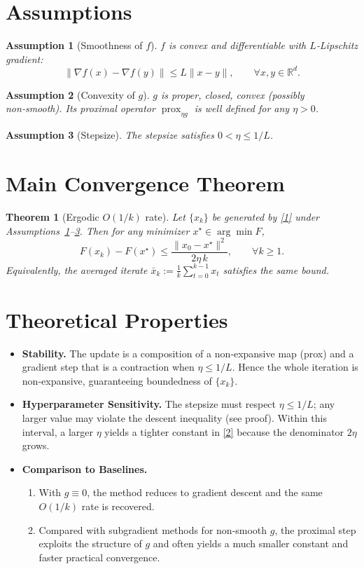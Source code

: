 \documentclass{article}
\newtheorem{theorem}{Theorem}
\newtheorem{assumption}{Assumption}
\newcommand{\prox}{\operatorname{prox}}
\newcommand{\R}{\mathbb{R}}
\begin{document}
\newpage

\section*{Assumptions}
\begin{assumption}[Smoothness of $f$]\label{ass:smooth}
$f$ is convex and differentiable with $L$‑Lipschitz gradient:
\[
\|\nabla f(x)-\nabla f(y)\|\le L\|x-y\|,\qquad\forall x,y\in\R^{d}.
\]
\end{assumption}
\begin{assumption}[Convexity of $g$]\label{ass:convex}
$g$ is proper, closed, convex (possibly non‑smooth). Its proximal operator $\prox_{\eta g}$ is well defined for any $\eta>0$.
\end{assumption}
\begin{assumption}[Stepsize]\label{ass:stepsize}
The stepsize satisfies $0<\eta\le 1/L$.
\end{assumption}

\section*{Main Convergence Theorem}
\begin{theorem}[Ergodic $O(1/k)$ rate]\label{thm:conv}
Let $\{x_{k}\}$ be generated by \eqref{1} under Assumptions~\ref{ass:smooth}–\ref{ass:stepsize}. Then for any minimizer $x^{\star}\in\arg\min F$,
\[
F(x_{k})-F(x^{\star})\le\frac{\|x_{0}-x^{\star}\|^{2}}{2\eta\,k},
\qquad\forall k\ge1.
\tag{2}
\]
Equivalently, the averaged iterate $\bar{x}_{k}:=\frac1k\sum_{t=0}^{k-1}x_{t}$ satisfies the same bound.
\end{theorem}

\section*{Theoretical Properties}
\begin{itemize}[leftmargin=*]
\item \textbf{Stability.} The update is a composition of a non‑expansive map (prox) and a gradient step that is a contraction when $\eta\le 1/L$. Hence the whole iteration is non‑expansive, guaranteeing boundedness of $\{x_{k}\}$.
\item \textbf{Hyperparameter Sensitivity.} The stepsize must respect $\eta\le 1/L$; any larger value may violate the descent inequality (see proof). Within this interval, a larger $\eta$ yields a tighter constant in \eqref{2} because the denominator $2\eta$ grows.
\item \textbf{Comparison to Baselines.}
    \begin{enumerate}
        \item With $g\equiv0$, the method reduces to gradient descent and the same $O(1/k)$ rate is recovered.
        \item Compared with subgradient methods for non‑smooth $g$, the proximal step exploits the structure of $g$ and often yields a much smaller constant and faster practical convergence.
    \end{enumerate}
\end{itemize}
\end{document}
